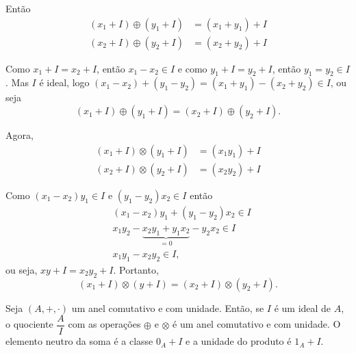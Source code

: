 Ent{\~a}o
\begin{align*}
    (x_1 + I) \oplus (y_1 + I) &= (x_1 + y_1) + I\\
    (x_2 + I) \oplus (y_2 + I) &= (x_2 + y_2) + I
\end{align*}

Como $x_1 + I = x_2 + I$, ent{\~a}o $x_1 - x_2 \in I$ e como $y_1 + I = y_2 + I$, ent{\~a}o $y_1 = y_2 \in I$. Mas $I$ {\'e} ideal, logo $(x_1 - x_2) + (y_1 - y_2) = (x_1 + y_1)
- (x_2 + y_2) \in I$, ou seja
\[
    (x_1 + I) \oplus (y_1 + I) = (x_2 + I) \oplus (y_2 + I).
\]

Agora,
\begin{align*}
    (x_1 + I) \otimes (y_1 + I) &= (x_1y_1) + I\\
    (x_2 + I) \otimes (y_2 + I) &= (x_2y_2) + I
\end{align*}

Como $(x_1 - x_2)y_1 \in I$ e $(y_1 - y_2)x_2 \in I$ ent\~ao
\begin{align*}
    &(x_1 - x_2)y_1 + (y_1 - y_2)x_2 \in I\\
    &x_1y_2-\underbrace{x_2y_1 + y_1x_2}_{= 0} - y_2x_2 \in I\\
    &x_1y_1 - x_2y_2\in I,
\end{align*}
ou seja, $xy + I = x_2y_2 + I$. Portanto,
\[
    (x_1 + I) \otimes (y + I) = (x_2 + I) \otimes (y_2 + I).
\]

\begin{teorema}
    Seja $(A, +, \cdot)$ um anel comutativo e com unidade. Ent{\~a}o, se $I$ {\'e} um ideal de $A$, o quociente $\dfrac{A}{I}$ com as opera{\c c}{\~o}es $\oplus$ e $\otimes$
    {\'e} um anel comutativo e com unidade. O elemento neutro da soma {\'e} a classe $0_{A} + I$ e a unidade do produto {\'e} $1_{A} + I$.
\end{teorema}
